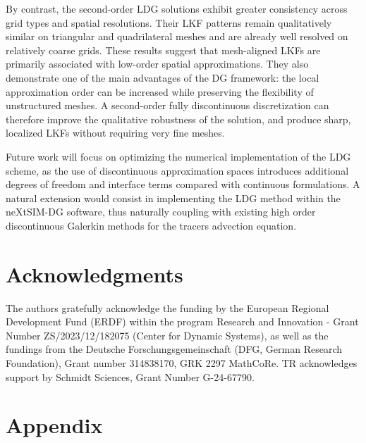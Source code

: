 \documentclass[11pt]{article}
\begin{document}
By contrast, the second-order LDG solutions exhibit greater consistency across grid types and spatial resolutions. Their LKF patterns remain qualitatively similar on triangular and quadrilateral meshes and are already well resolved on relatively coarse grids. These results suggest that mesh-aligned LKFs are primarily associated with low-order spatial approximations. They also demonstrate one of the main advantages of the DG framework: the local approximation order can be increased while preserving the flexibility of unstructured meshes. A second-order fully discontinuous discretization can therefore improve the qualitative robustness of the solution, and produce sharp, localized LKFs without requiring very fine meshes.

Future work will focus on optimizing the numerical implementation of the LDG scheme, as the use of discontinuous approximation spaces introduces additional degrees of freedom and interface terms compared with continuous formulations. A natural extension would consist in implementing the LDG method within the neXtSIM-DG software, thus naturally coupling with existing high order discontinuous Galerkin methods for the tracers advection equation.

\section*{Acknowledgments}
The authors gratefully acknowledge the funding by the European Regional Development Fund (ERDF) within the program Research and Innovation - Grant Number ZS/2023/12/182075 (Center for Dynamic Systems), as well as 
the fundings from the Deutsche Forschungsgemeinschaft (DFG, German Research Foundation), Grant number 314838170, GRK 2297 MathCoRe. TR  acknowledges support by Schmidt Sciences, Grant Number G-24-67790. 

\appendix
\section{Appendix}
\end{document}
